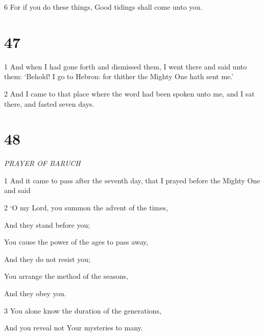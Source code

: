 \par 6 For if you do these things, Good tidings shall come unto you.

\par [Which I before told you of; nor shall you fall into the torment, of which I testified to you before.’

\par 7 But with regard to the word that I was to be taken I did not make (it) known to them or to my son.]

\chapter{47}

\par 1 And when I had gone forth and dismissed them, I went there and said unto them: ‘Behold! I go to Hebron: for thither the Mighty One hath sent me.’

\par 2 And I came to that place where the word had been spoken unto me, and I sat there, and fasted seven days.

\chapter{48}

\par \textit{PRAYER OF BARUCH}

\par 1 And it came to pass after the seventh day, that I prayed before the Mighty One and said

\par 2 ‘O my Lord, you summon the advent of the times,

\par And they stand before you;

\par You cause the power of the ages to pass away,

\par And they do not resist you;

\par You arrange the method of the seasons,

\par And they obey you.

\par 3 You alone know the duration of the generations,

\par And you reveal not Your mysteries to many.


